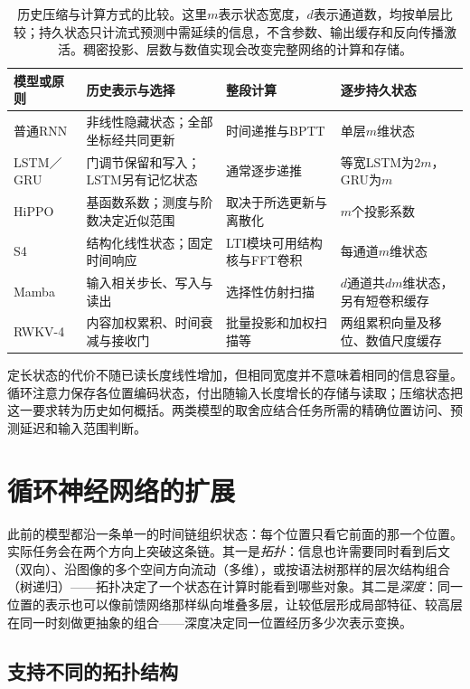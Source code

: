 \begin{table}[htb]
  \small
  \begin{tabularx}{\linewidth}{@{}p{19mm}XXX@{}}
    \toprule
    模型或原则 & 历史表示与选择 & 整段计算 & 逐步持久状态 \\
    \midrule
    普通RNN & 非线性隐藏状态；全部坐标经共同更新 & 时间递推与BPTT & 单层$m$维状态 \\
    LSTM／GRU & 门调节保留和写入；LSTM另有记忆状态 & 通常逐步递推 & 等宽LSTM为$2m$，GRU为$m$ \\
    HiPPO & 基函数系数；测度与阶数决定近似范围 & 取决于所选更新与离散化 & $m$个投影系数 \\
    S4 & 结构化线性状态；固定时间响应 & LTI模块可用结构核与FFT卷积 & 每通道$m$维状态 \\
    Mamba & 输入相关步长、写入与读出 & 选择性仿射扫描 & $d$通道共$dm$维状态，另有短卷积缓存 \\
    RWKV-4 & 内容加权累积、时间衰减与接收门 & 批量投影和加权扫描等 & 两组累积向量及移位、数值尺度缓存 \\
    \bottomrule
  \end{tabularx}
  \caption{历史压缩与计算方式的比较。这里$m$表示状态宽度，$d$表示通道数，均按单层比较；持久状态只计流式预测中需延续的信息，不含参数、输出缓存和反向传播激活。稠密投影、层数与数值实现会改变完整网络的计算和存储。}
  \label{tab:rnn-state-models}
\end{table}
\FloatBarrier

定长状态的代价不随已读长度线性增加，但相同宽度并不意味着相同的信息容量。循环注意力保存各位置编码状态，付出随输入长度增长的存储与读取；压缩状态把这一要求转为历史如何概括。两类模型的取舍应结合任务所需的精确位置访问、预测延迟和输入范围判断。

\FloatBarrier
\section{循环神经网络的扩展}
\label{sec:rnn-extensions}

此前的模型都沿一条单一的时间链组织状态：每个位置只看它前面的那一个位置。实际任务会在两个方向上突破这条链。其一是\emph{拓扑}：信息也许需要同时看到后文（双向）、沿图像的多个空间方向流动（多维），或按语法树那样的层次结构组合（树递归）——拓扑决定了一个状态在计算时能看到哪些对象。其二是\emph{深度}：同一位置的表示也可以像前馈网络那样纵向堆叠多层，让较低层形成局部特征、较高层在同一时刻做更抽象的组合——深度决定同一位置经历多少次表示变换。

\subsection{支持不同的拓扑结构}
\label{sec:rnn-topologies}

